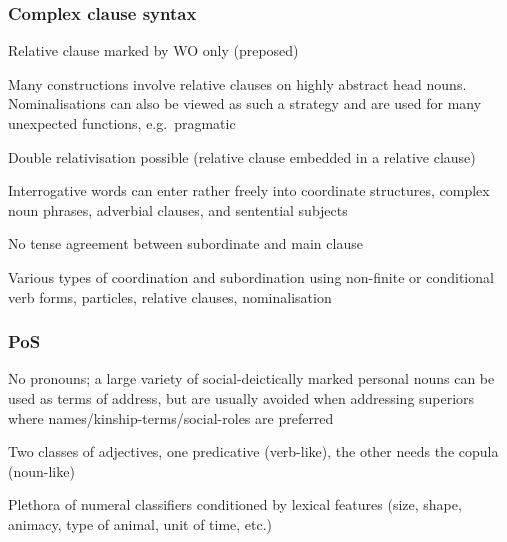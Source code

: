 \documentclass[a4paper, 11pt]{book}
\begin{document}
\subsubsection*{Complex clause syntax}
\begin{itemize*}
\item Relative clause marked by WO only (preposed)
\item Many constructions involve relative clauses on highly abstract head nouns. Nominalisations can also be viewed as such a strategy and are used for many unexpected functions, e.g.\ pragmatic
\item Double relativisation possible (relative clause embedded in a relative clause)
\item Interrogative words can enter rather freely into coordinate structures, complex noun phrases, adverbial clauses, and sentential subjects
\item No tense agreement between subordinate and main clause
\item Various types of coordination and subordination using non-finite or conditional verb forms, particles, relative clauses, nominalisation
\end{itemize*}

\subsubsection*{PoS}
\begin{itemize*}
\item No pronouns; a large variety of social-deictically marked personal nouns can be used as terms of address, but are usually avoided when addressing superiors where names/kinship-terms/social-roles are preferred
\item Two classes of adjectives, one predicative (verb-like), the other needs the copula (noun-like)
\item Plethora of numeral classifiers conditioned by lexical features (size, shape, animacy, type of animal, unit of time, etc.)
\end{itemize*}
\end{document}
